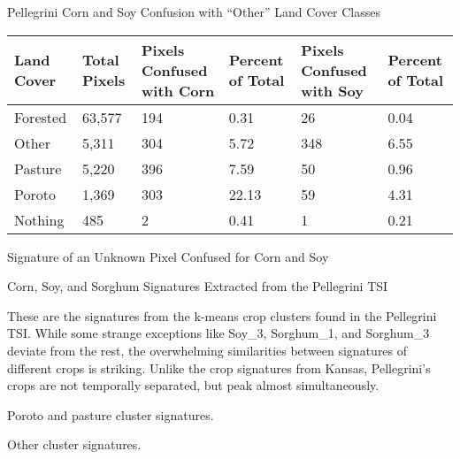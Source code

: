\begin{sstable}
  \centering
  \caption{Pellegrini Corn and Soy Confusion with ``Other'' Land Cover Classes}
  \label{table:ARotherconfusion}
  \begin{tabu}{X[0.6,m,c]X[0.5,m,c]|X[1,m,c]X[0.55,m,c]|X[1,m,c]X[0.55,m,c]}
    \toprule
    \textbf{Land Cover} & \textbf{Total Pixels} & \textbf{Pixels Confused with Corn} & \textbf{Percent of Total} & \textbf{Pixels Confused with Soy} & \textbf{Percent of Total} \\
    \midrule
    Forested & 63,577 & 194 & 0.31 & 26 & 0.04 \\
    Other & 5,311 & 304 & 5.72 & 348 & 6.55 \\
    Pasture & 5,220 & 396 & 7.59 & 50 & 0.96 \\
    Poroto & 1,369 & 303 & 22.13 & 59 & 4.31 \\
    Nothing & 485 & 2 & 0.41 & 1 & 0.21 \\
    \bottomrule
  \end{tabu}
\end{sstable}

\begin{ssfigure}
  \centering
  
  \caption{Signature of an Unknown Pixel Confused for Corn and Soy}
  \label{fig:ARweirdsig}
\end{ssfigure}

\begin{ssfigure}
  \centering
  
  \caption{Corn, Soy, and Sorghum Signatures Extracted from the Pellegrini TSI}
  \medskip
  \small
  These are the signatures from the k-means crop clusters found in the Pellegrini TSI. While some strange exceptions like Soy\_3, Sorghum\_1, and Sorghum\_3 deviate from the rest, the overwhelming similarities between signatures of different crops is striking. Unlike the crop signatures from Kansas, Pellegrini's crops are not temporally separated, but peak almost simultaneously.
  \label{fig:ARcropsigs}
\end{ssfigure}

\begin{ssfigure}
  \centering
  
  \caption{Poroto and pasture cluster signatures.}
  \label{fig:ARporotopasturesigs}
\end{ssfigure}

\begin{ssfigure}
  \centering
  
  \caption{Other cluster signatures.}
  \label{fig:ARothersigs}
\end{ssfigure}

























  